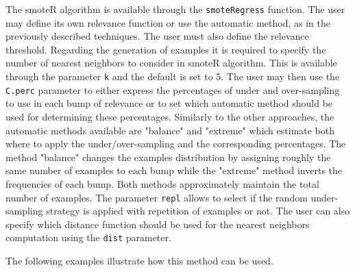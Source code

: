 \documentclass[10pt,a4paper]{article}\usepackage[]{graphicx}\usepackage[]{color}
\begin{document}
The smoteR algorithm is available through the \texttt{smoteRegress} function. The user may define its own relevance function or use the automatic method, as in the previously described techniques. The user must also define the relevance threshold. 
Regarding the generation of examples it is required to specify the number of nearest neighbors to consider in smoteR algorithm. This is available through the parameter \texttt{k} and the default is set to 5. The user may then use the \texttt{C.perc} parameter to either express the percentages of under and over-sampling to use in each bump of relevance or to set which automatic method should be used for determining these percentages. Similarly to the other approaches, the automatic methods available are "balance" and "extreme" which estimate both where to apply the under/over-sampling and the corresponding percentages. The method "balance" changes the examples distribution by assigning roughly the same number of examples to each bump while the "extreme" method inverts the frequencies of each bump. Both methods approximately maintain the total number of examples. The parameter \texttt{repl} allows to select if the random under-sampling strategy is applied with repetition of examples or not. The user can also specify which distance function should be used for the nearest neighbors computation using the \texttt{dist} parameter. 

The following examples illustrate how this method can be used.
\end{document}
